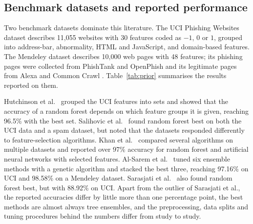 \documentclass[pdflatex,sn-mathphys-num]{sn-jnl}%
\theoremstyle{thmstyleone}%
\theoremstyle{thmstyletwo}%
\theoremstyle{thmstylethree}%
\begin{document}
\subsection{Benchmark datasets and reported performance}\label{subsec2-2}

Two benchmark datasets dominate this literature. The UCI Phishing Websites dataset \cite{mohammad2012uci} describes 11,055 websites with 30 features coded as $-1$, $0$ or $1$, grouped into address-bar, abnormality, HTML and JavaScript, and domain-based features. The Mendeley dataset \cite{tan2018} describes 10,000 web pages with 48 features; its phishing pages were collected from PhishTank and OpenPhish and its legitimate pages from Alexa and Common Crawl \cite{abdulsamad2023}. Table~\ref{tab:prior} summarises the results reported on them.

Hutchinson et al.\ \cite{hutchinson2018} grouped the UCI features into sets and showed that the accuracy of a random forest depends on which feature groups it is given, reaching 96.5\% with the best set. Salihovic et al.\ \cite{salihovic2019} found random forest best on both the UCI data and a spam dataset, but noted that the datasets responded differently to feature-selection algorithms. Khan et al.\ \cite{khan2020} compared several algorithms on multiple datasets and reported over 97\% accuracy for random forest and artificial neural networks with selected features. Al-Sarem et al.\ \cite{alsarem2021} tuned six ensemble methods with a genetic algorithm and stacked the best three, reaching 97.16\% on UCI and 98.58\% on a Mendeley dataset. Sarasjati et al.\ \cite{sarasjati2022} also found random forest best, but with 88.92\% on UCI. Apart from the outlier of Sarasjati et al., the reported accuracies differ by little more than one percentage point, the best methods are almost always tree ensembles, and the preprocessing, data splits and tuning procedures behind the numbers differ from study to study.
\end{document}
